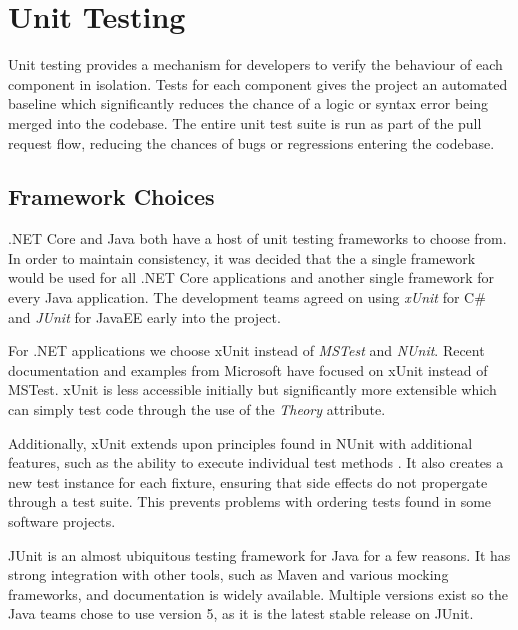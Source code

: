 \section{Unit Testing}
\par
Unit testing provides a mechanism for developers to verify the behaviour of each component in isolation. Tests for each component gives the project an automated baseline which significantly reduces the chance of a logic or syntax error being merged into the codebase. The entire unit test suite is run as part of the pull request flow, reducing the chances of bugs or regressions entering the codebase.

\par
\subsection{Framework Choices}
.NET Core and Java both have a host of unit testing frameworks to choose from. In order to maintain consistency, it was decided that the a single framework would be used for all .NET Core applications and another single framework for every Java application. The development teams agreed on using \textit{xUnit}\cite{xUnit} for C\# and \textit{JUnit}\cite{JUnit} for JavaEE early into the project.

\par
For .NET applications we choose xUnit instead of \textit{MSTest} and \textit{NUnit}. Recent documentation and examples from Microsoft have focused on xUnit instead of MSTest. xUnit is less accessible initially but significantly more extensible which can simply test code through the use of the \textit{Theory} attribute.

\par
Additionally, xUnit extends upon principles found in NUnit with additional features, such as the ability to execute individual test methods \cite{Nunit_XUnit_comparison}. It also creates a new test instance for each fixture, ensuring that side effects do not propergate through a test suite. This prevents problems with ordering tests found in some software projects.

\par
JUnit is an almost ubiquitous testing framework for Java for a few reasons. It has strong integration with other tools, such as Maven and various mocking frameworks, and documentation is widely available. Multiple versions exist so the Java teams chose to use version 5, as it is the latest stable release on JUnit.

